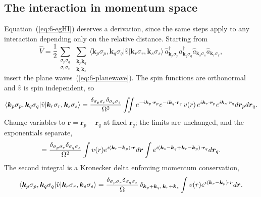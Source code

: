 \subsection{The interaction in momentum space}
\label{sec:egmomentum}

Equation~(\ref{eq:6-egHI}) deserves a derivation, since the same steps apply
to any interaction depending only on the relative distance.  Starting from
\begin{equation}
  \hat{V} = \frac{1}{2}\sum_{\substack{\sigma_p\sigma_q\\ \sigma_r\sigma_s}}
    \sum_{\substack{\bm{k}_p\bm{k}_q\\ \bm{k}_r\bm{k}_s}}
    \langle \bm{k}_p\sigma_p,\bm{k}_q\sigma_q\vert\hat{v}\vert
      \bm{k}_r\sigma_r,\bm{k}_s\sigma_s\rangle\,
    \hat{a}^{\dagger}_{\bm{k}_p\sigma_p}
    \hat{a}^{\dagger}_{\bm{k}_q\sigma_q}
    \hat{a}_{\bm{k}_s\sigma_s}\hat{a}_{\bm{k}_r\sigma_r},
  \label{eq:6-Vgeneral}
\end{equation}
insert the plane waves~(\ref{eq:6-planewave}).  The spin functions are
orthonormal and $\hat{v}$ is spin independent, so
\begin{equation}
  \langle \bm{k}_p\sigma_p,\bm{k}_q\sigma_q\vert\hat{v}\vert
    \bm{k}_r\sigma_r,\bm{k}_s\sigma_s\rangle
  = \frac{\delta_{\sigma_p\sigma_r}\delta_{\sigma_q\sigma_s}}{\Omega^2}
    \iint e^{-i\bm{k}_p\cdot\bm{r}_p}
          e^{-i\bm{k}_q\cdot\bm{r}_q}\,v(r)\,
          e^{i\bm{k}_r\cdot\bm{r}_p}
          e^{i\bm{k}_s\cdot\bm{r}_q}
      d\bm{r}_pd\bm{r}_q.
  \label{eq:6-planewaveme}
\end{equation}
Change variables to $\bm{r}=\bm{r}_p-\bm{r}_q$ at fixed $\bm{r}_q$; the limits
are unchanged, and the exponentials separate,
\begin{equation}
  = \frac{\delta_{\sigma_p\sigma_r}\delta_{\sigma_q\sigma_s}}{\Omega^2}
    \int v(r)e^{i(\bm{k}_r-\bm{k}_p)\cdot\bm{r}}d\bm{r}
    \int e^{i(\bm{k}_s-\bm{k}_q+\bm{k}_r-\bm{k}_p)\cdot\bm{r}_q}
      d\bm{r}_q.
  \label{eq:6-separated}
\end{equation}
The second integral is a Kronecker delta enforcing momentum conservation,
\begin{equation}
  \langle \bm{k}_p\sigma_p,\bm{k}_q\sigma_q\vert\hat{v}\vert
    \bm{k}_r\sigma_r,\bm{k}_s\sigma_s\rangle
  = \frac{\delta_{\sigma_p\sigma_r}\delta_{\sigma_q\sigma_s}}{\Omega}
    \,\delta_{\bm{k}_p+\bm{k}_q,\,\bm{k}_r+\bm{k}_s}
    \int v(r)e^{i(\bm{k}_r-\bm{k}_p)\cdot\bm{r}}d\bm{r} .
  \label{eq:6-momentumconservation}
\end{equation}
